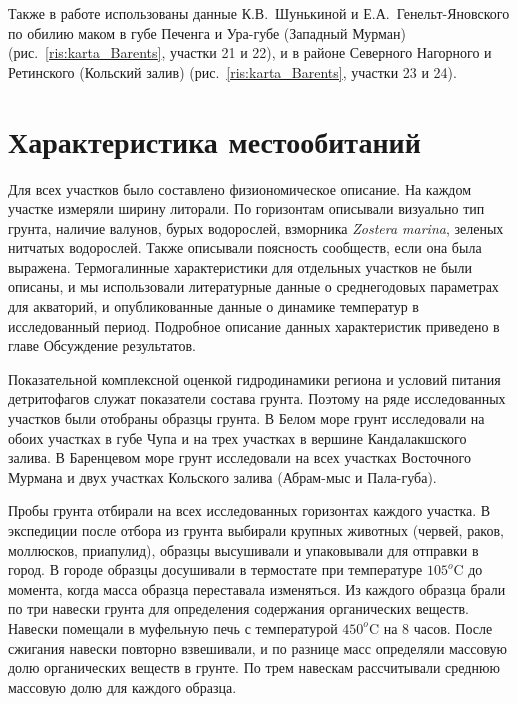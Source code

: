 Также в работе использованы данные К.\:В.~Шунькиной и Е.\:А.~Генельт-Яновского по обилию маком в губе Печенга и Ура-губе (Западный Мурман) (рис.~\ref{ris:karta_Barents}, участки 21 и 22), и в районе Северного Нагорного и Ретинского (Кольский залив) (рис.~\ref{ris:karta_Barents}, участки 23 и 24).

\afterpage{\clearpage}

    \section{Характеристика местообитаний}
Для всех участков было составлено физиономическое описание.
На каждом участке измеряли ширину литорали.
По горизонтам описывали визуально тип грунта, наличие валунов, бурых водорослей, взморника \textit{Zostera marina}, зеленых нитчатых водорослей. 
Также описывали поясность сообществ, если она была выражена.
Термогалинные характеристики для отдельных участков не были описаны, и мы использовали литературные данные о среднегодовых параметрах для акваторий, и опубликованные данные о динамике температур в исследованный период.
Подробное описание данных характеристик приведено в главе Обсуждение результатов.

Показательной комплексной оценкой гидродинамики региона и условий питания детритофагов служат показатели состава грунта. 
Поэтому на ряде исследованных участков были отобраны образцы грунта. 
В Белом море грунт исследовали на обоих участках в губе Чупа и на трех участках в вершине Кандалакшского залива.
В Баренцевом море грунт исследовали на всех участках Восточного Мурмана и двух участках Кольского залива (Абрам-мыс и Пала-губа).

Пробы грунта отбирали на всех исследованных горизонтах каждого участка.
В экспедиции после отбора из грунта выбирали крупных животных (червей, раков, моллюсков, приапулид), образцы высушивали и упаковывали для отправки в город. 
В городе образцы досушивали в термостате при температуре $105^o$C до момента, когда масса образца переставала изменяться. 
Из каждого образца брали по три навески грунта для определения содержания органических веществ. 
Навески помещали в муфельную печь с температурой $450^o$C на $8$ часов. 
После сжигания навески повторно взвешивали, и по разнице масс определяли массовую долю органических веществ в грунте. 
По трем навескам рассчитывали среднюю массовую долю для каждого образца.

